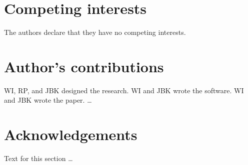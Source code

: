 \documentclass{bmcart}
\begin{document}
\begin{backmatter}

\section*{Competing interests}
  The authors declare that they have no competing interests.

\section*{Author's contributions}
    WI, RP, and JBK designed the research. WI and JBK wrote the software. WI and JBK wrote the paper. \ldots

\section*{Acknowledgements}
  Text for this section \ldots





\end{backmatter}
\end{document}
